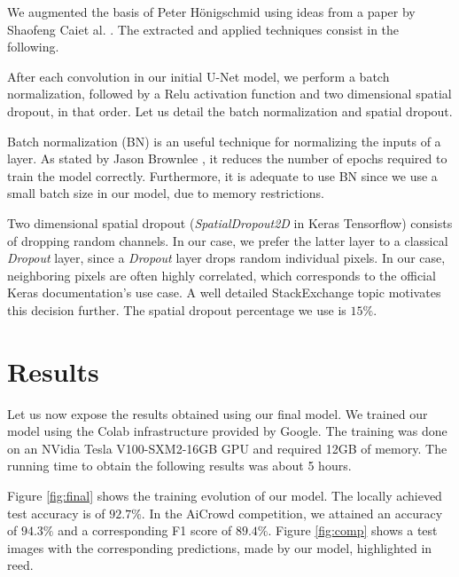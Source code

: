 \documentclass[10pt,conference,compsocconf]{IEEEtran}
\begin{document}
We augmented the basis of Peter Hönigschmid \cite{unet} using ideas from a paper by Shaofeng Caiet al. \cite{final}. The extracted and applied techniques consist in the following.

After each convolution in our initial U-Net model, we perform a batch normalization, followed by a Relu activation function and two dimensional spatial dropout, in that order. Let us detail the batch normalization and spatial dropout.

Batch normalization (BN) is an useful technique for normalizing the inputs of a layer. As stated by Jason Brownlee \cite{bn}, it reduces the number of epochs required to train the model correctly. Furthermore, it is adequate to use BN since we use a small batch size in our model, due to memory restrictions.

Two dimensional spatial dropout (\textit{SpatialDropout2D} in Keras Tensorflow) consists of dropping random channels. In our case, we prefer the latter layer to a classical \textit{Dropout} layer, since a \textit{Dropout} layer drops random individual pixels. In our case, neighboring pixels are often highly correlated, which corresponds to the official Keras documentation's \cite{keras} use case. A well detailed StackExchange topic \cite{stack} motivates this decision further. The spatial dropout percentage we use is $15\%$.


\section{Results}
\label{sec:results}

Let us now expose the results obtained using our final model. We trained our model using the Colab infrastructure provided by Google. The training was done on an NVidia Tesla V100-SXM2-16GB GPU and required 12GB of memory. The running time to obtain the following results was about 5 hours.

Figure \ref{fig:final} shows the training evolution of our model. The locally achieved test accuracy is of $92.7\%$. In the AiCrowd competition, we attained an accuracy of $94.3\%$ and a corresponding F1 score of $89.4\%$. Figure \ref{fig:comp} shows a test images with the corresponding predictions, made by our model, highlighted in reed.
\end{document}
